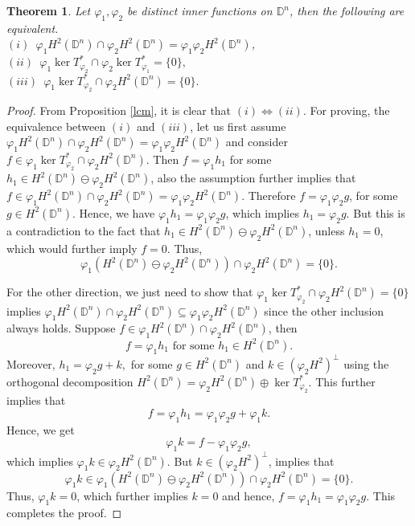 \documentclass[12pt, a4 paper]{amsart}
\newcommand{\D}{\mathbb{D}}
\theoremstyle{definition}
\theoremstyle{plain}
\newtheorem{thm}{Theorem}[section]
\theoremstyle{definition}
\numberwithin{equation}{section}
\let\phi=\varphi
\begin{document}
\begin{thm}
    Let $\phi_1,\phi_2$ be distinct inner functions on $\mathbb{D}^n$, then the following are equivalent.\\ \vspace{2mm}
        $(i)$~$\phi_1 H^2(\mathbb{D}^n)\cap \phi_2 H^2(\mathbb{D}^n)=\phi_1\phi_2H^2(\mathbb{D}^n)$,\\ \vspace{1mm}
          $(ii)$~$\phi_1 \ker T_{\phi_2}^* \cap \phi_2 \ker T_{\phi_1}^*=\{0\},$\\ \vspace{1mm}
          $(iii)$~$ \phi_1 \ker T_{\phi_2}^* \cap \phi_2 H^2(\mathbb{D}^n)=\{0\}.$
        \end{thm}
    \begin{proof}
From Proposition \ref{lcm}, it is clear that $(i) \Longleftrightarrow (ii)$. For proving, the equivalence between $(i)$ and $(iii)$, let us first assume $\phi_1 H^2(\mathbb{D}^n)\cap \phi_2 H^2(\mathbb{D}^n)=\phi_1\phi_2H^2(\mathbb{D}^n)$ and consider 
$
   f \in \phi_1 \ker T_{\phi_2}^* \cap \phi_2 H^2(\mathbb{D}^n).
$
 Then $f=\phi_1 h_1$ for some $h_1\in H^2(\mathbb{D}^n)\ominus \phi_2H^2(\mathbb{D}^n)$, also the assumption further implies that $f\in \phi_1 H^2(\mathbb{D}^n)\cap \phi_2 H^2(\mathbb{D}^n)=\phi_1\phi_2H^2(\mathbb{D}^n).$ Therefore $f=\phi_1\phi_2g$, for some $g\in H^2(\mathbb{D}^n). $ Hence, we have $\phi_1h_1=\phi_1\phi_2g$, which implies $h_1=\phi_2g$. But this is a contradiction to the fact that $h_1\in H^2(\mathbb{D}^n)\ominus \phi_2H^2(\mathbb{D}^n)$, unless $h_1=0$, which would further imply $f=0$. Thus, $$\phi_1(H^2(\mathbb{D}^n)\ominus \phi_2H^2(\mathbb{D}^n))\cap \phi_2H^2(\mathbb{D}^n)=\{0\}.$$

For the other direction, we just need to show that $\phi_1 \ker T_{\phi_2}^* \cap \phi_2 H^2(\mathbb{D}^n)=\{0\}$ implies $ \phi_1 H^2(\mathbb{D}^n)\cap\phi_2 H^2(\mathbb{D}^n) \subseteq \phi_1\phi_2 H^2(\mathbb{D}^n)$ since the other inclusion always holds. Suppose $f\in \phi_1H^2(\D^n)\cap\phi_2H^2(\mathbb{D}^n)$, then $$f=\phi_1h_1\text{ for some }h_1\in H^2(\mathbb{D}^n).$$ Moreover,  $h_1=\phi_2g+k,$ for some $g \in H^2(\D^n)$ and $k\in (\phi_2H^2)^\perp$ using the orthogonal decomposition $H^2(\D^n) = \phi_2 H^2(\D^n) \oplus \ker T_{\phi_2}^*$. This further implies that $$f=\phi_1h_1=\phi_1\phi_2g+\phi_1k.$$ Hence, we get $$\phi_1k=f-\phi_1\phi_2g,$$ which implies $\phi_1k\in \phi_2H^2(\D^n).$ But $k\in (\phi_2H^2)^\perp$, implies that $$\phi_1k\in \phi_1(H^2(\mathbb{D}^n)\ominus \phi_2H^2(\mathbb{D}^n))\cap \phi_2H^2(\mathbb{D}^n)=\{0\}.$$ Thus, $\phi_1k=0$, which further implies $k=0$ and hence, $f=\phi_1h_1=\phi_1\phi_2g$.  This completes the proof.
    \end{proof}
\end{document}

